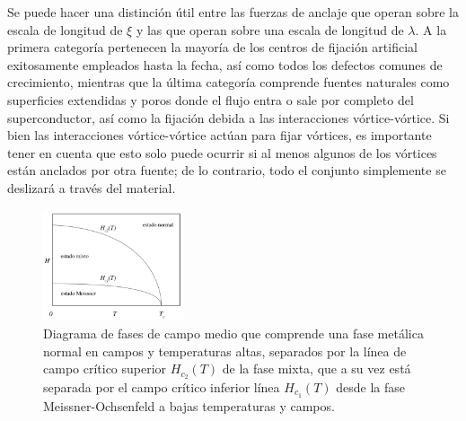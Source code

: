 \documentclass[a4paper,conference]{IEEEtran}
\begin{document}
Se puede
hacer una distinci\'{o}n \'{u}til entre las fuerzas de anclaje que operan sobre
la escala de longitud de $\xi$
y las que operan sobre una escala de longitud de $\lambda$.
A la primera categor\'{i}a pertenecen la mayor\'{i}a de los
centros de fijaci\'{o}n artificial exitosamente empleados hasta la fecha,
as\'{i} como todos los defectos comunes de crecimiento, mientras que la
\'{u}ltima categor\'{i}a comprende fuentes naturales como superficies extendidas
y poros donde el flujo entra o sale por completo del superconductor, as\'{i}
como la fijaci\'{o}n debida a las interacciones v\'{o}rtice-v\'{o}rtice.
Si bien las interacciones v\'{o}rtice-v\'{o}rtice act\'{u}an para fijar v\'{o}rtices, es
importante tener en cuenta que esto solo puede ocurrir si al menos algunos de
los v\'{o}rtices est\'{a}n anclados por otra fuente; de lo contrario, todo el
conjunto simplemente se deslizar\'{a} a trav\'{e}s del material.

\begin{figure}[!ht]
				\centering 
				\includegraphics[width=0.37\textwidth]{diagrama_fase_HT} 
				\caption{Diagrama de fases de campo medio que comprende una fase met\'{a}lica
				normal en campos y temperaturas altas, separados por la l\'{i}nea de campo
				cr\'{i}tico superior $H_{c_2}(T)$ de la fase mixta, que a su vez
				est\'{a} separada por el campo cr\'{i}tico inferior l\'{i}nea $H_{c_1}(T)$ desde la fase
				Meissner-Ochsenfeld a bajas temperaturas y campos.
				} 
				\label{fig:diagrama_fase_ht}
\end{figure}
\end{document}
